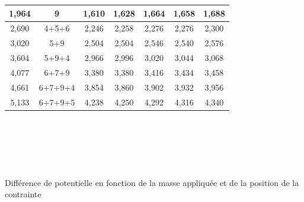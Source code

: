 \documentclass[10pt,a4paper]{report}
\begin{document}
\begin{center}
\begin{tabular}{|c|c|c|c|c|c|c|}
{\color[HTML]{963400} 1,964}                            & {\color[HTML]{963400} 9}                         & {\color[HTML]{036400} 1,610}    & {\color[HTML]{036400} 1,628}    & {\color[HTML]{036400} 1,664}    & {\color[HTML]{036400} 1,658}    & {\color[HTML]{036400} 1,688}    \\ \hline
{\color[HTML]{963400} 2,690}                            & {\color[HTML]{963400} 4+5+6}                     & {\color[HTML]{036400} 2,246}    & {\color[HTML]{036400} 2,258}    & {\color[HTML]{036400} 2,276}    & {\color[HTML]{036400} 2,276}    & {\color[HTML]{036400} 2,300}    \\ \hline
{\color[HTML]{963400} 3,020}                            & {\color[HTML]{963400} 5+9}                       & {\color[HTML]{036400} 2,504}    & {\color[HTML]{036400} 2,504}    & {\color[HTML]{036400} 2,546}    & {\color[HTML]{036400} 2,540}    & {\color[HTML]{036400} 2,576}    \\ \hline
{\color[HTML]{963400} 3,604}                            & {\color[HTML]{963400} 5+9+4}                     & {\color[HTML]{036400} 2,966}    & {\color[HTML]{036400} 2,996}    & {\color[HTML]{036400} 3,020}    & {\color[HTML]{036400} 3,044}    & {\color[HTML]{036400} 3,068}    \\ \hline
{\color[HTML]{963400} 4,077}                            & {\color[HTML]{963400} 6+7+9}                     & {\color[HTML]{036400} 3,380}    & {\color[HTML]{036400} 3,380}    & {\color[HTML]{036400} 3,416}    & {\color[HTML]{036400} 3,434}    & {\color[HTML]{036400} 3,458}    \\ \hline
{\color[HTML]{963400} 4,661}                            & {\color[HTML]{963400} 6+7+9+4}                   & {\color[HTML]{036400} 3,854}    & {\color[HTML]{036400} 3,860}    & {\color[HTML]{036400} 3,902}    & {\color[HTML]{036400} 3,932}    & {\color[HTML]{036400} 3,956}    \\ \hline
{\color[HTML]{963400} 5,133}                            & {\color[HTML]{963400} 6+7+9+5}                   & {\color[HTML]{036400} 4,238}    & {\color[HTML]{036400} 4,250}    & {\color[HTML]{036400} 4,292}    & {\color[HTML]{036400} 4,316}    & {\color[HTML]{036400} 4,340}    \\ \hline
\end{tabular}
~\\~\\~\\~\\~\\
Différence de potentielle en fonction de la masse appliquée et de la position de la contrainte~\\

\end{center}
\end{document}
